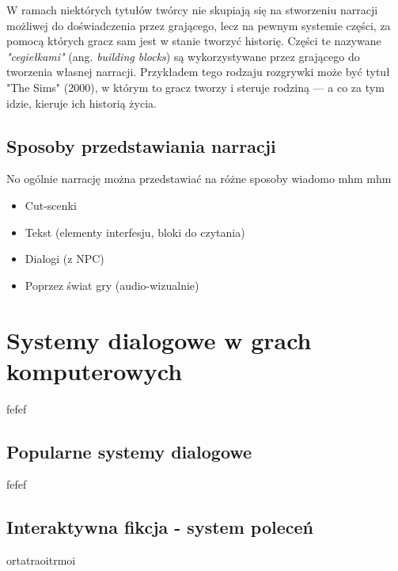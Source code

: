 W ramach niektórych tytułów twórcy nie skupiają się na stworzeniu narracji możliwej do doświadczenia
przez grającego, lecz na pewnym systemie części, za pomocą których gracz sam jest w stanie tworzyć
historię. Części te nazywane \textit{"cegiełkami"} (ang. \textit{building blocks})\cite{theorising_narrative}
są wykorzystywane przez grającego do tworzenia własnej narracji. Przykładem tego rodzaju rozgrywki
może być tytuł "The Sims" (2000), w którym to gracz tworzy i steruje rodziną --- a co za tym idzie,
kieruje ich historią życia.

\subsection{Sposoby przedstawiania narracji}\label{subsection:ch1_2_2}

No ogólnie narrację można przedstawiać na różne sposoby wiadomo mhm mhm

\begin{itemize}
	\item Cut-scenki
	\item Tekst (elementy interfesju, bloki do czytania)
	\item Dialogi (z NPC)
	\item Poprzez świat gry (audio-wizualnie)
\end{itemize}

\newpage

\section{Systemy dialogowe w grach komputerowych}\label{section:ch1_3}

fefef

\subsection{Popularne systemy dialogowe}\label{subsection:ch1_3_1}

fefef

\subsection{Interaktywna fikcja - system poleceń}\label{subsection:ch1_3_2}

ortatraoitrmoi
